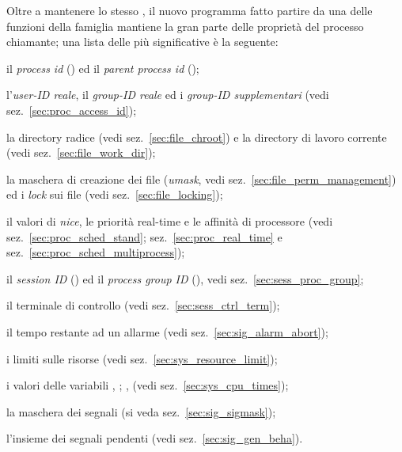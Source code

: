 Oltre a mantenere lo stesso , il nuovo programma fatto partire da una
delle funzioni della famiglia  mantiene la gran parte delle
proprietà del processo chiamante; una lista delle più significative è la
seguente:
\begin{itemize*}
\item il \textit{process id} () ed il \textit{parent process id}
  ();
\item l'\textsl{user-ID reale}, il \textsl{group-ID reale} ed i
  \textsl{group-ID supplementari} (vedi sez.~\ref{sec:proc_access_id});
\item la directory radice (vedi sez.~\ref{sec:file_chroot}) e la directory di
  lavoro corrente (vedi sez.~\ref{sec:file_work_dir});
\item la maschera di creazione dei file (\textit{umask}, vedi
  sez.~\ref{sec:file_perm_management}) ed i \textit{lock} sui file (vedi
  sez.~\ref{sec:file_locking});
\item il valori di \textit{nice}, le priorità real-time e le affinità di
  processore (vedi sez.~\ref{sec:proc_sched_stand};
  sez.~\ref{sec:proc_real_time} e sez.~\ref{sec:proc_sched_multiprocess});
\item il \textit{session ID} () ed il \textit{process group ID}
  (), vedi sez.~\ref{sec:sess_proc_group};
\item il terminale di controllo (vedi sez.~\ref{sec:sess_ctrl_term});
\item il tempo restante ad un allarme (vedi sez.~\ref{sec:sig_alarm_abort});
\item i limiti sulle risorse (vedi sez.~\ref{sec:sys_resource_limit});
\item i valori delle variabili , ;
  ,  (vedi sez.~\ref{sec:sys_cpu_times});
\item la maschera dei segnali (si veda sez.~\ref{sec:sig_sigmask});
\item l'insieme dei segnali pendenti (vedi sez.~\ref{sec:sig_gen_beha}).
\end{itemize*}


